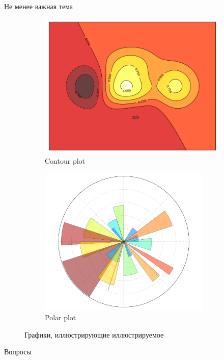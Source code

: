 \documentclass[10pt]{beamer}
\begin{document}
\begin{frame}{Не менее важная тема}

\begin{figure}
        \centering
        \begin{subfigure}[b]{0.5\textwidth}
                \includegraphics[width=\textwidth]{images/contour.png}
                \caption{Contour plot}                
        \end{subfigure}%
        \begin{subfigure}[b]{0.5\textwidth}
                \includegraphics[width=0.9\textwidth]{images/polar.png}
                \caption{Polar plot}                
        \end{subfigure}       
        \caption{Графики, иллюстрирующие иллюстрируемое}
\end{figure}

\end{frame}

\begin{frame}{}
\begin{center}
{\Large Вопросы}
\end{center}
\end{frame}
\end{document}
